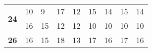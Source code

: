 \begin{table}[!htbp]
{\begin{tabular}{|c|ll|ll|ll|ll|}
\multirow{2}{*}{\textbf{24}}     & \multicolumn{1}{l|}{10}                                                                                 & 9                                                                                                    & \multicolumn{1}{l|}{17}                                                                                 & 12                                                                                                   & \multicolumn{1}{l|}{15}                                                                                 & 14                                                                                                   & \multicolumn{1}{l|}{15}                                                                                 & 14                                                                                                   \\ \cline{2-9} 
                                 & \multicolumn{1}{l|}{16}                                                                                 & 15                                                                                                   & \multicolumn{1}{l|}{12}                                                                                 & 12                                                                                                   & \multicolumn{1}{l|}{10}                                                                                 & 10                                                                                                   & \multicolumn{1}{l|}{10}                                                                                 & 10                                                                                                   \\ \hline
\multirow{2}{*}{\textbf{26}}     & \multicolumn{1}{l|}{16}                                                                                 & 15                                                                                                   & \multicolumn{1}{l|}{18}                                                                                 & 13                                                                                                   & \multicolumn{1}{l|}{17}                                                                                 & 16                                                                                                   & \multicolumn{1}{l|}{17}                                                                                 & 16                                                                                                   \\ \cline{2-9} 

\end{tabular}}
\end{table}
